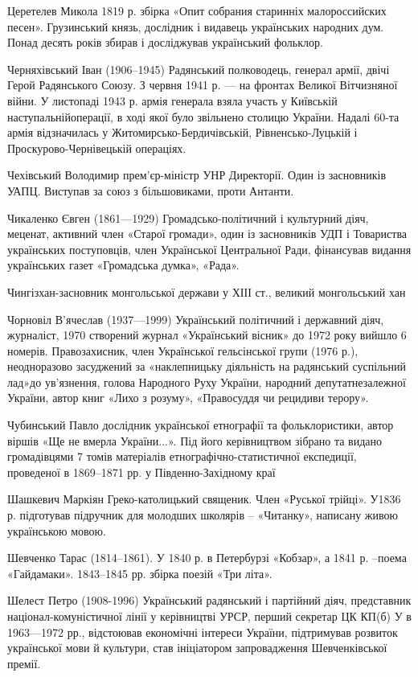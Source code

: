 Церетелев Микола 1819 р. збірка «Опит собрания старинніх малороссийских песен». Грузинський князь, дослідник і видавець українських народних дум. Понад десять років збирав і досліджував український фольклор.

Черняхівський Іван   (1906–1945) Радянський полководець, генерал армії, двічі Герой Радянського Союзу. З червня 1941 р. — на фронтах Великої Вітчизняної війни. У листопаді 1943 р. армія генерала взяла участь у Київській наступальнійоперації, в ході якої було звільнено столицю України. Надалі 60-та армія відзначилась у Житомирсько-Бердичівській, Рівненсько-Луцькій і Проскурово-Чернівецькій операціях.

Чехівський Володимир прем'єр-міністр УНР Директорії. Один із засновників УАПЦ.  Виступав за союз з більшовиками, проти Антанти.

Чикаленко Євген (1861—1929) Громадсько-політичний і культурний діяч, меценат, активний член «Старої громади», один із засновників УДП і Товариства українських поступовців, член Української Центральної Ради, фінансував видання українських газет «Громадська думка», «Рада».

Чингізхан-засновник монгольської держави у ХІІІ ст., великий монгольський хан

Чорновіл В’ячеслав (1937—1999) Український політичний і державний діяч, журналіст, 1970 створений журнал «Український вісник» до 1972 року вийшло 6 номерів. Правозахисник, член Української гельсінської групи (1976 р.), неодноразово засуджений за «наклепницьку діяльність на радянський суспільний лад»до ув’язнення, голова Народного Руху України, народний депутатнезалежної України, автор книг «Лихо з розуму», «Правосуддя чи рецидиви терору». 

Чубинський Павло дослідник української етнографії та фольклористики, автор віршів «Ще не вмерла України...». Під його керівництвом зібрано та видано громадівцями  7 томів матеріалів етнографічно-статистичної експедиції, проведеної в 1869–1871 рр. у Південно-Західному краї

Шашкевич Маркіян Греко-католицький священик. Член «Руської трійці». У1836 р. підготував підручник для молодших школярів – «Читанку», написану живою українською мовою.

Шевченко Тарас (1814–1861). У 1840 р. в Петербурзі «Кобзар», а 1841 р. –поема «Гайдамаки». 1843–1845 рр. збірка поезій «Три літа».

Шелест Петро (1908-1996) Український радянський і партійний діяч, представник націонал-комуністичної лінії у керівництві УРСР, перший секретар ЦК КП(б) У в 1963—1972 рр., відстоював економічні інтереси України, підтримував розвиток української мови й культури, став ініціатором запровадження Шевченківської премії.

